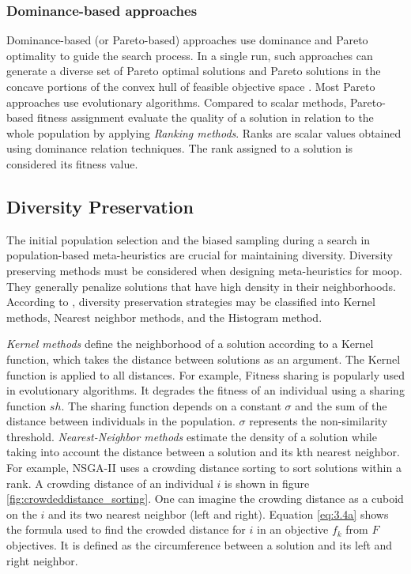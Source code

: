 \subsubsection{Dominance-based approaches}
Dominance-based (or Pareto-based) approaches use dominance and Pareto optimality to guide the search process. In a single run, such approaches can generate a diverse set of Pareto optimal solutions and Pareto solutions in the concave portions of the convex hull of feasible objective space \parencite{Talbi2009Metaheuristics:Implementation}. Most Pareto approaches use evolutionary algorithms. Compared to scalar methods, Pareto-based fitness assignment evaluate the quality of a solution in relation to the whole population by applying \textit{ Ranking methods}. Ranks are scalar values obtained using dominance relation techniques. The rank assigned to a solution is considered its fitness value.


\subsection{Diversity Preservation}\label{sec:diversitypreservation}
The initial population selection and the biased sampling during a search in population-based meta-heuristics are crucial for maintaining diversity. Diversity preserving methods must be considered when designing meta-heuristics for \gls{moop}. They generally penalize solutions that have high density in their neighborhoods. According to \parencite{Emmerich2018AMethods}, diversity preservation strategies may be classified into Kernel methods, Nearest neighbor methods, and the Histogram method.

\textit{Kernel methods} define the neighborhood of a solution according to a Kernel function, which takes the distance between solutions as an argument. The Kernel function is applied to all distances. For example, Fitness sharing is popularly used in evolutionary algorithms. It degrades the fitness of an individual using a sharing function $sh$. The sharing function depends on a constant $\sigma$ and the sum of the distance between individuals in the population.  $\sigma$ represents the non-similarity threshold.  \textit{Nearest-Neighbor methods} estimate the density of a solution while taking into account the distance between a solution and its kth nearest neighbor. For example, NSGA-II uses a crowding distance sorting to sort solutions within a rank. A crowding distance of an individual $i$ is shown in figure \ref{fig:crowdeddistance_sorting}. One can imagine the crowding distance as a cuboid on the $i$ and its two nearest neighbor (left and right). Equation \ref{eq:3.4a} shows the formula used to find the crowded distance for $i$ in an objective $f_k$ from $F$ objectives. It is defined as the circumference between a solution and its left and right neighbor. 

